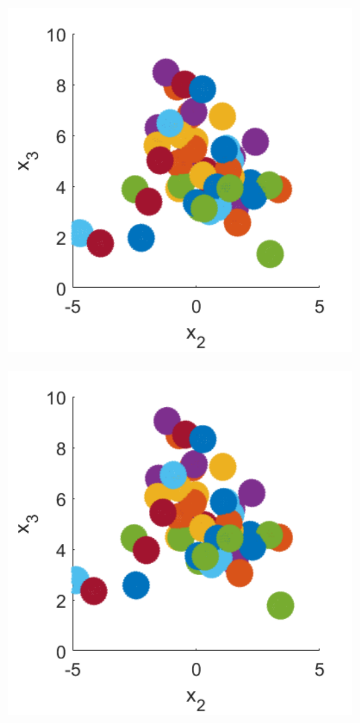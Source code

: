 \begin{figure}
\begin{subfigure}[b]{0.2\textwidth}
    \caption[]{\label{fig:squirmerPosF}}
\end{subfigure}\hfill
\begin{subfigure}[b]{0.2\textwidth}
    \centering
    \includegraphics[width=\textwidth]{Images/squirmers/Gyro-7-All.pdf}
    \caption[]{\label{fig:squirmerPosG}}
\end{subfigure}\hfill
\begin{subfigure}[b]{0.2\textwidth}
    \centering
    \includegraphics[width=\textwidth]{Images/squirmers/Gyro-8-All.pdf}

\end{subfigure}
\end{figure}
